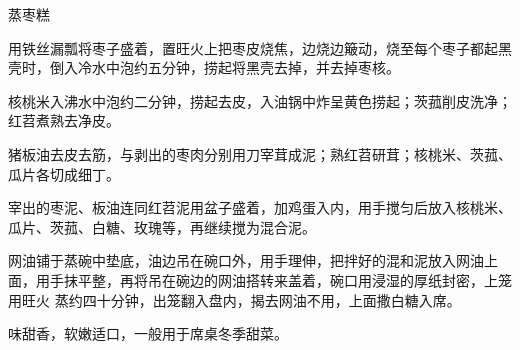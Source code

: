 %
%
%
%
%
%
%
\begin{recipe}{蒸枣糕}

\ingredients


\preparation

\step 用铁丝漏瓢将枣子盛着，置旺火上把枣皮烧焦，边烧边簸动，烧至每个枣子都起黑
壳时，倒入冷水中泡约五分钟，捞起将黑壳去掉，并去掉枣核。

\step 核桃米入沸水中泡约二分钟，捞起去皮，入油锅中炸呈黄色捞起；茨菰削皮洗净；
红苕煮熟去净皮。

\step 猪板油去皮去筋，与剥出的枣肉分别用刀宰茸成泥；熟红苕研茸；核桃米、茨菰、
瓜片各切成细丁。

\step 宰出的枣泥、板油连同红苕泥用盆子盛着，加鸡蛋入内，用手搅匀后放入核桃米、
瓜片、茨菰、白糖、玫瑰等，再继续搅为混合泥。

\step 网油铺于蒸碗中垫底，油边吊在碗口外，用手理伸，把拌好的混和泥放入网油上
面，用手抹平整，再将吊在碗边的网油搭转来盖着，碗口用浸湿的厚纸封密，上笼用旺火
蒸约四十分钟，出笼翻入盘内，揭去网油不用，上面撒白糖入席。

\features

味甜香，软嫩适口，一般用于席桌冬季甜菜。

\end{recipe}

